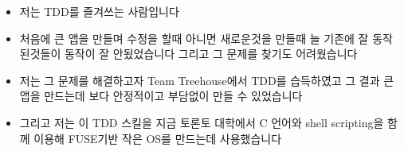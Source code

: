 \documentclass[12pt]{article}
\begin{document}
\begin{itemize}
\begin{itemize}
        \bigskip

        \begin{itemize}
            \item 저는 TDD를 즐겨쓰는 사람입니다
            \item 처음에 큰 앱을 만들며 수정을 할때 아니면 새로운것을 만들때 늘 기존에 잘 동작된것들이 동작이 잘 안됬었습니다 그리고 그 문제를 찾기도 어려웠습니다
            \item 저는 그 문제를 해결하고자 Team Treehouse에서 TDD를 습득하였고 그 결과
            큰 앱을 만드는데 보다 안정적이고 부담없이 만들 수 있었습니다
            \item 그리고 저는 이 TDD 스킬을 지금 토론토 대학에서 C 언어와 shell scripting을 함께 이용해 FUSE기반 작은 OS를 만드는데 사용했습니다
        \end{itemize}
    \end{itemize}
\end{itemize}
\end{document}
